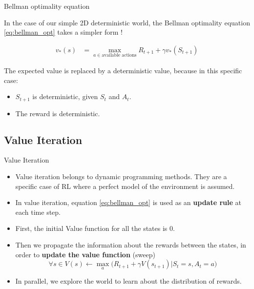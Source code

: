\documentclass[usenames,dvipsnames]{beamer}
\begin{document}
\begin{frame}{Bellman optimality equation}

    In the case of our simple 2D deterministic world, the Bellman optimality equation \ref{eq:bellman_opt} takes a simpler form !

           \begin{equation}
	       \begin{aligned}
	       	\label{eq:bellman_opt_simple}
		   v_*(s) &= \max_{a\in\text{available actions}} R_{t+1}+\gamma v_{*}(S_{t+1})
	       \end{aligned}
           \end{equation}

	   The expected value is replaced by a deterministic value, because in this specific case:
	   \begin{itemize}
	       \item $S_{t+1}$ is deterministic, given $S_t$ and $A_t$.
		\item The reward is deterministic.
	   \end{itemize}

\end{frame}

\subsection{Value Iteration}%
\label{sub:value_iteration}

\begin{frame}{Value Iteration}
    \begin{itemize}
	\item Value iteration belongs to dynamic programming methods. They are a specific case of RL where a perfect model of the environment is assumed.
	\item In value iteration, equation \ref{eq:bellman_opt} is used as an \textbf{update rule} at each time step.
        \item First, the initial Value function for all the states is $0$.
	\item Then we propagate the information about the rewards between the states, in order to \textbf{{update the value function}} (sweep)
		\begin{equation}
		    \forall s\in V(s) \leftarrow \max_{a}\big( R_{t+1}+\gamma V(s_{t+1}) | S_t=s, A_t=a\big)
		\end{equation}

	\item In parallel, we explore the world to learn about the distribution of rewards.
    \end{itemize}
\end{frame}
\end{document}
